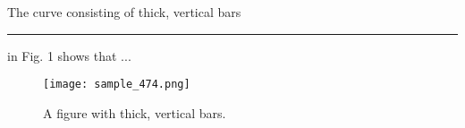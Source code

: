 \documentclass{article}
\begin{document}
The curve consisting of thick, vertical bars \textcolor{red}{\rule{10pt}{10pt}} in Fig. 1 shows that ...

\begin{figure}[h]
    \centering
    \texttt{[image: sample\_474.png]}
    \caption{A figure with thick, vertical bars.}
    \label{fig:thick_bars}
\end{figure}
\end{document}
